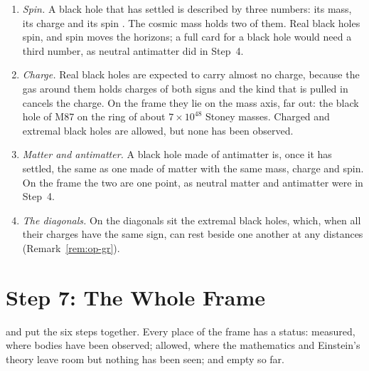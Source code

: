 \begin{remark}\label{rem:fa-leaves-out}
\leavevmode
\begin{enumerate}
  \item \emph{Spin.} A black hole that has settled is described by three numbers: its mass, its charge and its spin \citep{MTW1973}. The cosmic mass holds two of them. Real black holes spin, and spin moves the horizons; a full card for a black hole would need a third number, as neutral antimatter did in Step~4.
  \item \emph{Charge.} Real black holes are expected to carry almost no charge, because the gas around them holds charges of both signs and the kind that is pulled in cancels the charge. On the frame they lie on the mass axis, far out: the black hole of M87 on the ring of about $7 \times 10^{48}$ Stoney masses. Charged and extremal black holes are allowed, but none has been observed.
  \item \emph{Matter and antimatter.} A black hole made of antimatter is, once it has settled, the same as one made of matter with the same mass, charge and spin. On the frame the two are one point, as neutral matter and antimatter were in Step~4.
  \item \emph{The diagonals.} On the diagonals sit the extremal black holes, which, when all their charges have the same sign, can rest beside one another at any distances (Remark~\ref{rem:op-gr}).
\end{enumerate}
\end{remark}

\section{Step 7: The Whole Frame}\label{sec:fa-whole}

 and  put the six steps together. Every place of the frame has a status: measured, where bodies have been observed; allowed, where the mathematics and Einstein's theory leave room but nothing has been seen; and empty so far.

